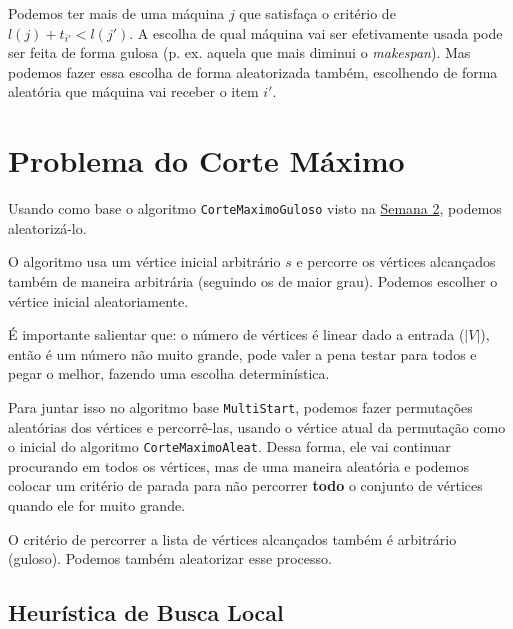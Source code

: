 Podemos ter mais de uma máquina $j$ que satisfaça o critério de $l(j) + t_{i'} < l(j')$. A escolha de qual máquina vai ser efetivamente usada pode ser feita de forma gulosa (p. ex. aquela que mais diminui o \textit{makespan}). Mas podemos fazer essa escolha de forma aleatorizada também, escolhendo de forma aleatória que máquina vai receber o item $i'$.

\section{Problema do Corte Máximo}

Usando como base o algoritmo \lstinline{CorteMaximoGuloso} visto na \hyperref[chp:semana2]{Semana 2}, podemos aleatorizá-lo.

\begin{algorithm}
	\SetAlgoLined

\end{algorithm}

O algoritmo usa um vértice inicial arbitrário $s$ e percorre os vértices alcançados também de maneira arbitrária (seguindo os de maior grau). Podemos escolher o vértice inicial aleatoriamente.

É importante salientar que: o número de vértices é linear dado a entrada ($|V|$), então é um número não muito grande, pode valer a pena testar para todos e pegar o melhor, fazendo uma escolha determinística.

Para juntar isso no algoritmo base \lstinline{MultiStart}, podemos fazer permutações aleatórias dos vértices e percorrê-las, usando o vértice atual da permutação como o inicial do algoritmo \lstinline{CorteMaximoAleat}. Dessa forma, ele vai continuar procurando em todos os vértices, mas de uma maneira aleatória e podemos colocar um critério de parada para não percorrer \textbf{todo} o conjunto de vértices quando ele for muito grande.

O critério de percorrer a lista de vértices alcançados também é arbitrário (guloso). Podemos também aleatorizar esse processo.

\subsection{Heurística de Busca Local}


